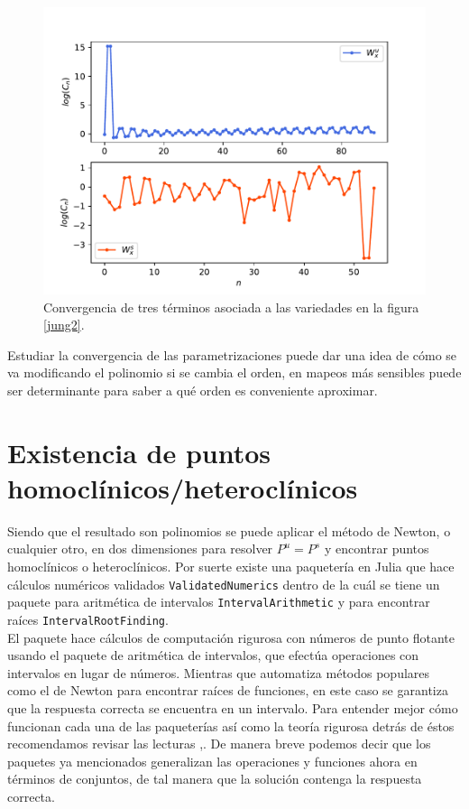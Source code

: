 \begin{figure}[H]
\centering
\includegraphics[scale=0.5]{convergenciaJungT57}
\caption{Convergencia de tres términos asociada a las variedades en la figura \ref{jung2}.}
\label{convergenciaJ3}
\end{figure}

Estudiar la convergencia de las parametrizaciones puede dar una idea de cómo se va modificando el polinomio si se cambia el orden, en mapeos más sensibles puede ser determinante para saber a qué orden es conveniente aproximar. 

\section{Existencia de puntos homoclínicos/heteroclínicos}

Siendo que el resultado son polinomios se puede aplicar el método de Newton, o cualquier otro, en dos dimensiones para resolver $P^{u}=P^{s}$ y encontrar puntos homoclínicos o heteroclínicos. Por suerte existe una paquetería en Julia que hace cálculos numéricos validados \texttt{ValidatedNumerics}\cite{validated} dentro de la cuál se tiene un paquete para aritmética de intervalos \texttt{IntervalArithmetic}\citep{interval} y para encontrar raíces \texttt{IntervalRootFinding}\cite{root}.\\

El paquete \cite{validated} hace cálculos de computación rigurosa con números de punto flotante usando el paquete de aritmética de intervalos, que efectúa operaciones con intervalos en lugar de números. Mientras que \cite{root} automatiza métodos populares como el de Newton para encontrar raíces de funciones, en este caso se garantiza que la respuesta correcta se encuentra en un intervalo. Para entender mejor cómo funcionan cada una de las paqueterías así como la teoría rigurosa detrás de éstos recomendamos revisar las lecturas \cite{ramon},\cite{Numerics}. De manera breve podemos decir que los paquetes ya mencionados generalizan las operaciones y funciones ahora en términos de conjuntos, de tal manera que la solución contenga la respuesta correcta. \\

